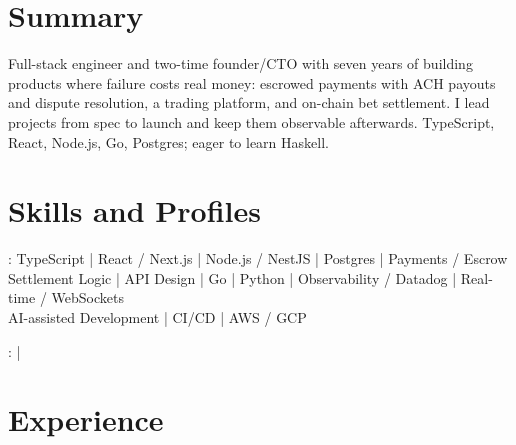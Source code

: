 \documentclass[print]{jack-resume}
\begin{document}
\pagecolor{darkmodeBackground}


\begin{minipage}[t][1cm][t]{.03\textwidth}
    \hfill
\end{minipage}

\section{Summary}
Full-stack engineer and two-time founder/CTO with seven years of building products where failure costs real money: escrowed payments with ACH payouts and dispute resolution, a trading platform, and on-chain bet settlement. I lead projects from spec to launch and keep them observable afterwards. TypeScript, React, Node.js, Go, Postgres; eager to learn Haskell.
\sectionsep

\section{Skills and Profiles}
:
TypeScript \hfill | \hfill
React / Next.js \hfill | \hfill
Node.js / NestJS \hfill | \hfill
Postgres \hfill | \hfill
Payments / Escrow \\
\hspace{1.0cm} Settlement Logic \hfill | \hfill
API Design \hfill | \hfill
Go \hfill | \hfill
Python \hfill | \hfill
Observability / Datadog \hfill | \hfill
Real-time / WebSockets \\
\hspace{1.0cm} AI-assisted Development \hfill | \hfill
CI/CD \hfill | \hfill
AWS / GCP \\

\raggedright{
    :
      \href{https://www.linkedin.com/in/jack-sturtevant/}{ \ExternalLink} |
     \href{https://github.com/jacksturt}{ \ExternalLink}}

\section{Experience}
\end{document}
